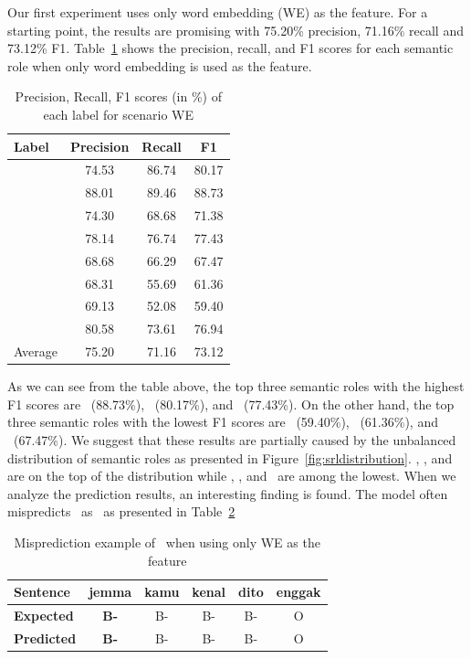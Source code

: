 Our first experiment uses only word embedding (WE) as the feature. For a starting point, the results are promising with 75.20\% precision, 71.16\% recall and 73.12\% F1. Table~\ref{tab:ex11srl} shows the precision, recall, and F1 scores for each semantic role when only word embedding is used as the feature.

\begin{table}
	\centering
	\caption{Precision, Recall, F1 scores (in \%) of each label for scenario WE}
	\label{tab:ex11srl}
	\begin{tabular}{lccc}
		\hline
		Label & Precision & Recall & F1 \\
		\hline\hline
		\agent & 74.53 & 86.74 & 80.17 \\
		\predicate & 88.01 & 89.46 & 88.73 \\
		\patient & 74.30 & 68.68 & 71.38 \\
		\modal & 78.14 & 76.74 & 77.43 \\
		\beneficiary & 68.68 & 66.29 & 67.47 \\
		\location & 68.31 & 55.69 & 61.36 \\
		\greet & 69.13 & 52.08 & 59.40 \\
		\timesrl & 80.58 & 73.61 & 76.94 \\
		\hline
		Average & 75.20 & 71.16 & 73.12\\
		\hline
	\end{tabular}

\end{table}


As we can see from the table above, the top three semantic roles with the highest F1 scores are \predicate~(88.73\%), \agent~(80.17\%), and \modal~(77.43\%). On the other hand, the top three semantic roles with the lowest F1 scores are \greet~(59.40\%), \location~(61.36\%), and \beneficiary~(67.47\%). We suggest that these results are partially caused by the unbalanced distribution of semantic roles as presented in Figure~\ref{fig:srldistribution}. \predicate, \agent, and \modal~ are on the top of the distribution while \greet, \location, and \beneficiary~are among the lowest. When we analyze the prediction results, an interesting finding is found. The model often mispredicts \greet~as \agent~as presented in Table~\ref{tab:contohgreetagent}

\begin{table}
	\centering
	\caption{Misprediction example of \greet~when using only WE as the feature}
	\label{tab:contohgreetagent}
	\begin{tabular}{|l|ccccc|}
		\hline
		\textbf{Sentence} 				& jemma & kamu & kenal & dito & enggak \\
		\hline
		\textbf{Expected}				& \textbf{B-\greet} & B-\agent & B-\predicate & B-\patient  & O\\
		\hline
		\textbf{Predicted}		& \textbf{B-\agent} & B-\agent & B-\predicate & B-\patient  & O\\
		\hline
	\end{tabular}
\end{table}

